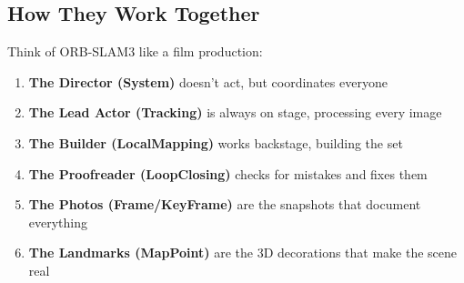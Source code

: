 \subsection{How They Work Together}

Think of ORB-SLAM3 like a film production:

\begin{enumerate}
    \item \textbf{The Director (System)} doesn't act, but coordinates everyone
    \item \textbf{The Lead Actor (Tracking)} is always on stage, processing every image
    \item \textbf{The Builder (LocalMapping)} works backstage, building the set
    \item \textbf{The Proofreader (LoopClosing)} checks for mistakes and fixes them
    \item \textbf{The Photos (Frame/KeyFrame)} are the snapshots that document everything
    \item \textbf{The Landmarks (MapPoint)} are the 3D decorations that make the scene real
\end{enumerate}
